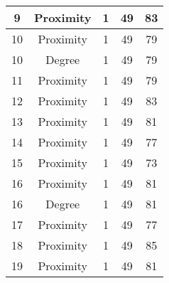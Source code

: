 \documentclass[results.tex]{subfiles}
\begin{document}
\begin{center}
\begin{tabular}{| c || c | c | c | c |}
            \hline
            9                       & Proximity                    & 1                      & 49                      & 83                   \\
            \hline
            10                      & Proximity                    & 1                      & 49                      & 79                   \\
            \hline
            10                      & Degree                       & 1                      & 49                      & 79                   \\
            \hline
            11                      & Proximity                    & 1                      & 49                      & 79                   \\
            \hline
            12                      & Proximity                    & 1                      & 49                      & 83                   \\
            \hline
            13                      & Proximity                    & 1                      & 49                      & 81                   \\
            \hline
            14                      & Proximity                    & 1                      & 49                      & 77                   \\
            \hline
            15                      & Proximity                    & 1                      & 49                      & 73                   \\
            \hline
            16                      & Proximity                    & 1                      & 49                      & 81                   \\
            \hline
            16                      & Degree                       & 1                      & 49                      & 81                   \\
            \hline
            17                      & Proximity                    & 1                      & 49                      & 77                   \\
            \hline
            18                      & Proximity                    & 1                      & 49                      & 85                   \\
            \hline
            19                      & Proximity                    & 1                      & 49                      & 81                   \\

\end{tabular}
\end{center}
\end{document}
